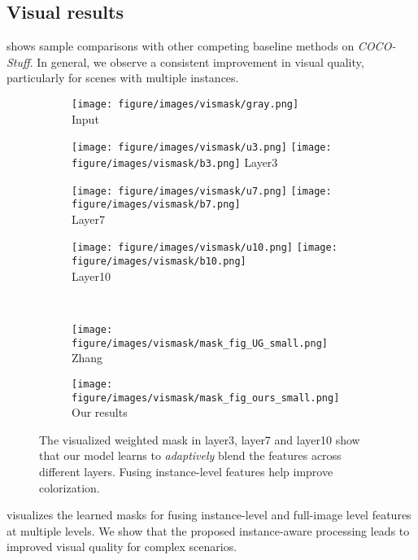 \subsection{Visual results}
\label{sec:visual}


 shows sample comparisons with other competing baseline methods on \emph{COCO-Stuff}. 
In general, we observe a consistent improvement in visual quality, particularly for scenes with multiple instances.

\begin{figure}[!t]
    \begin{subfigure}[!t]{.39\linewidth}\centering
       \texttt{[image: figure/images/vismask/gray.png]}\\
       {Input}
    \end{subfigure}
    \begin{subfigure}[!t]{.19\linewidth}\centering
       \texttt{[image: figure/images/vismask/u3.png]}
       \texttt{[image: figure/images/vismask/b3.png]}
       {Layer3}
    \end{subfigure}
    \begin{subfigure}[!t]{.19\linewidth}\centering
       \texttt{[image: figure/images/vismask/u7.png]}
       \texttt{[image: figure/images/vismask/b7.png]}\\
       {Layer7}
    \end{subfigure}
    \begin{subfigure}[!t]{.19\linewidth}\centering
       \texttt{[image: figure/images/vismask/u10.png]}
       \texttt{[image: figure/images/vismask/b10.png]}\\
       {Layer10}
    \end{subfigure}
    \\
    \begin{subfigure}[!t]{0.49\linewidth}\centering
        \texttt{[image: figure/images/vismask/mask\_fig\_UG\_small.png]}
        {Zhang~\etal~\cite{Zhang-SIGGRAPH-2017}}
    \end{subfigure}
    \begin{subfigure}[!t]{0.49\linewidth}\centering
        \texttt{[image: figure/images/vismask/mask\_fig\_ours\_small.png]}
        {Our results}
    \end{subfigure}
    \vspace{\figcapmargin}
    \caption{ The visualized weighted mask in layer3, layer7 and layer10 show that our model learns to \emph{adaptively} blend the features across different layers. Fusing instance-level features help improve colorization.}
    \label{fig:vismask}
\end{figure} 
  visualizes the learned masks for fusing instance-level and full-image level features at multiple levels. 
We show that the proposed instance-aware processing leads to improved visual quality for complex scenarios. 


